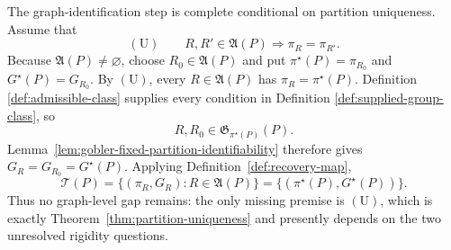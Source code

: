 The graph-identification step is complete conditional on partition
uniqueness.  Assume that
\[
 (\mathrm U)\qquad
 R,R'\in\mathfrak A(P)\Longrightarrow\pi_R=\pi_{R'}.
\]
Because \(\mathfrak A(P)\ne\varnothing\), choose
\(R_0\in\mathfrak A(P)\) and put
\(\pi^\star(P)=\pi_{R_0}\) and \(G^\star(P)=G_{R_0}\).  By \((\mathrm U)\),
every \(R\in\mathfrak A(P)\) has \(\pi_R=\pi^\star(P)\).  Definition
\ref{def:admissible-class} supplies every condition in Definition
\ref{def:supplied-group-class}, so
\[
 R,R_0\in\mathfrak G_{\pi^\star(P)}(P).
\]
Lemma~\ref{lem:gobler-fixed-partition-identifiability} therefore gives
\(G_R=G_{R_0}=G^\star(P)\).  Applying Definition~\ref{def:recovery-map},
\[
 \mathcal T(P)
 =\{(\pi_R,G_R):R\in\mathfrak A(P)\}
 =\{(\pi^\star(P),G^\star(P))\}.
\]
Thus no graph-level gap remains: the only missing premise is \((\mathrm U)\),
which is exactly Theorem~\ref{thm:partition-uniqueness} and presently depends
on the two unresolved rigidity questions.